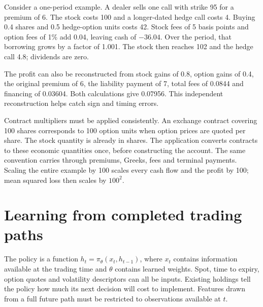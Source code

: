 \documentclass[8pt]{strategynet-journal}
\begin{document}
\begin{SNcolumns}
Consider a one-period example. A dealer sells one call with strike 95 for a
premium of 6. The stock costs 100 and a longer-dated hedge call costs 4.
Buying 0.4 shares and 0.5 hedge-option units costs 42. Stock fees of 5 basis
points and option fees of 1\% add 0.04, leaving cash of $-36.04$. Over the
period, that borrowing grows by a factor of 1.001. The stock then reaches
102 and the hedge call 4.8; dividends are zero.

\begin{center}
\end{center}

The profit can also be reconstructed from stock gains of 0.8, option gains
of 0.4, the original premium of 6, the liability payment of 7, total fees
of 0.0844 and financing of 0.03604. Both calculations give 0.07956.
This independent reconstruction helps catch sign and timing errors.

Contract multipliers must be applied consistently. An exchange contract
covering 100 shares corresponds to 100 option units when option prices are
quoted per share. The stock quantity is already in shares. The application
converts contracts to these economic quantities once, before constructing
the account. The same convention carries through premiums, Greeks, fees and
terminal payments. Scaling the entire example by 100 scales every cash flow
and the profit by 100; mean squared loss then scales by $100^2$.

\section{Learning from completed trading paths}
The policy is a function $h_t=\pi_\theta(x_t,h_{t-1})$, where $x_t$ contains
information available at the trading time and $\theta$ contains learned
weights. Spot, time to expiry, option quotes and volatility descriptors can
all be inputs. Existing holdings tell the policy how much its next decision
will cost to implement. Features drawn from a full future path must be
restricted to observations available at $t$.


\end{SNcolumns}
\end{document}
